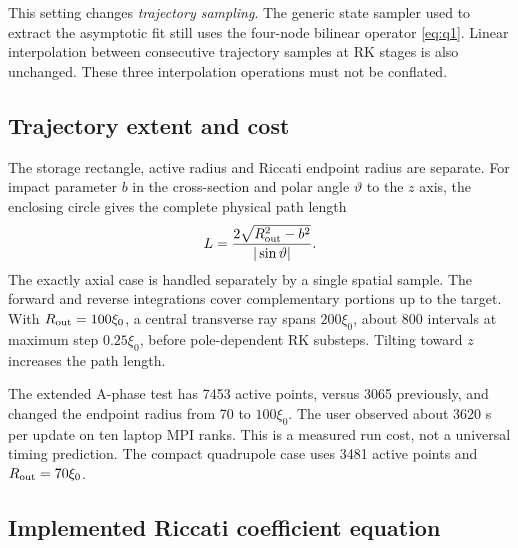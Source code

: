 \documentclass[11pt,a4paper]{article}
\begin{document}
This setting changes \emph{trajectory sampling}. The generic state sampler
used to extract the asymptotic fit still uses the four-node bilinear
operator \eqref{eq:q1}. Linear interpolation between consecutive trajectory
samples at RK stages is also unchanged. These three interpolation operations
must not be conflated.

\subsection{Trajectory extent and cost}

The storage rectangle, active radius and Riccati endpoint radius are separate.
For impact parameter $b$ in the cross-section and polar angle $\vartheta$ to
the $z$ axis, the enclosing circle gives the complete physical path length
\begin{equation}
 L=\frac{2\sqrt{R_{\rm out}^2-b^2}}{|\sin\vartheta|}.
 \label{eq:trajectorylength}
\end{equation}
The exactly axial case is handled separately by a single spatial sample.
The forward and reverse integrations cover complementary portions up to the
target. With $R_{\rm out}=100\xi_0$, a central transverse ray spans
$200\xi_0$, about 800 intervals at maximum step $0.25\xi_0$, before
pole-dependent RK substeps. Tilting toward $z$ increases the path length.

The extended A-phase test has 7453 active points, versus 3065 previously,
and changed the endpoint radius from 70 to $100\xi_0$. The user observed
about 3620 s per update on ten laptop MPI ranks. This is a measured run
cost, not a universal timing prediction. The compact quadrupole case uses
3481 active points and $R_{\rm out}=70\xi_0$.


\subsection{Implemented Riccati coefficient equation}
\end{document}
